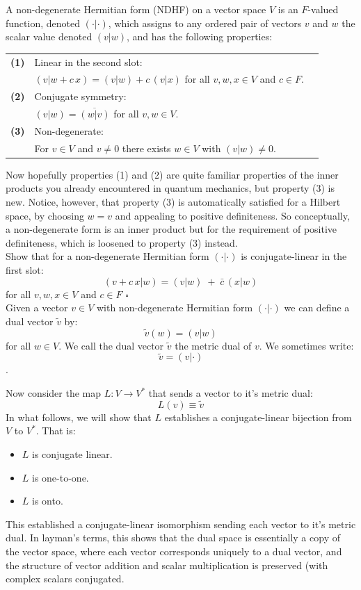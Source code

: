 \documentclass[12pt]{article}
\begin{document}
A non-degenerate Hermitian form (NDHF) on a vector space $V$ is an
$F$-valued function, denoted $(\cdot|\cdot)$, which assigns to any
ordered pair of vectors $v$ and $w$ the scalar value denoted $(v|w)$,
and has the following properties:
\begin{center}
\begin{tabular}{lll}
  {\bf (1)} & Linear in the second slot: \\
  & $(v|w+c\, x) = (v|w) + c\, (v|x)$ for all  $v,w,x \in V$ and $c \in F$.\\[6pt]
{\bf (2)} & Conjugate symmetry: \\
  & $(v|w) = \overline{(w|v)}$ for all $v,w \in V$.\\[6pt]
{\bf (3)} & Non-degenerate:\\
 & For $v \in V$ and $v \neq 0$ there exists $w \in V$ with $(v|w) \neq 0$.\\[6pt]
\end{tabular}
\end{center}
Now hopefully properties (1) and (2) are quite familiar properties of
the inner products you already encountered in quantum mechanics, but
property (3) is new.  Notice, however, that property (3) is
automatically satisfied for a Hilbert space, by choosing $w=v$ and appealing to
positive definiteness.  So conceptually, a non-degenerate form is an
inner product but for the requirement of positive definiteness, which
is loosened to property (3) instead.\\[3pt]

\exercise
Show that for a non-degenerate Hermitian form $(\cdot|\cdot)$ is conjugate-linear in the first slot:
$$(v+c \, x| w) = (v| w) \; + \; \bar{c} \, (x| w)$$
for all $v,w,x \in V$ and $c \in F$  $\square$ \\[3pt]

\noindent
Given a vector $v \in V$ with non-degenerate Hermitian form
$(\cdot|\cdot)$ we can define a dual vector $\tilde{v}$ by:
$$\tilde{v}(w) = (v|w)$$
for all $w \in V$.  We call the dual vector $\tilde{v}$ the metric dual of $v$.  We sometimes write:
$$\widetilde{v} = (v|\cdot)$$.

Now consider the map $L: V \to V^*$ that sends a vector to it's metric dual:
$$L(v) \equiv \tilde{v}$$
In what follows, we will show that $L$ establishes a conjugate-linear bijection from $V$ to $V^*$.  That is:
\begin{itemize}
 \item $L$ is conjugate linear.
 \item $L$ is one-to-one.
 \item $L$ is onto.
\end{itemize}
This established a conjugate-linear isomorphism sending each vector to
it's metric dual.  In layman's terms, this shows that the dual space
is essentially a copy of the vector space, where each vector
corresponds uniquely to a dual vector, and the structure of vector
addition and scalar multiplication is preserved (with complex scalars
conjugated.\\
\end{document}
